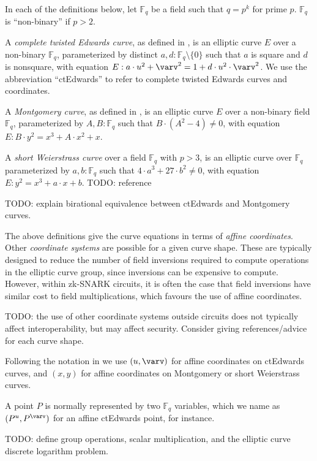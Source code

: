 \documentclass{article}
\newcommand{\typecolon}{:}
\newcommand{\Field}[1]{\mathbb{F}_{\!#1}}
\newcommand{\setof}[1]{\{{#1}\}}
\newcommand{\mult}{\cdot}
\begin{document}
In each of the definitions below, let $\Field{q}$ be a field such that $q = p^k$ for
prime $p$. $\Field{q}$ is ``non-binary'' if $p > 2$.

A \emph{complete twisted Edwards curve}, as defined in \cite[section 4.3.4]{BL2017},
is an elliptic curve $E$ over a non-binary $\Field{q}$, parameterized by distinct
$a, d \typecolon \Field{q} \setminus \setof{0}$ such that $a$ is square and $d$ is nonsquare,
with equation $E : a \mult u^2 + \varv^2 = 1 + d \mult u^2 \mult \varv^2$.
We use the abbreviation ``ctEdwards'' to refer to complete twisted Edwards curves
and coordinates.

A \emph{Montgomery curve}, as defined in \cite[section 4.3]{BL2017},
is an elliptic curve $E$ over a non-binary field $\Field{q}$, parameterized by
$A, B \typecolon \Field{q}$ such that $B \mult (A^2 - 4) \neq 0$, with equation
$E : B \mult y^2 = x^3 + A \mult x^2 + x$.

A \emph{short Weierstrass curve} over a field $\Field{q}$ with $p > 3$, is an
elliptic curve over $\Field{q}$ parameterized by $a, b \typecolon \Field{q}$
such that $4 \mult a^3 + 27 \mult b^2 \neq 0$, with equation
$E : y^2 = x^3 + a \mult x + b$. TODO: reference

TODO: explain birational equivalence between ctEdwards and Montgomery curves.

The above definitions give the curve equations in terms of \emph{affine coordinates}.
Other \emph{coordinate systems} are possible for a given curve shape. These are typically
designed to reduce the number of field inversions required to compute operations in the
elliptic curve group, since inversions can be expensive to compute. However, within
zk-SNARK circuits, it is often the case that field inversions have similar cost to field
multiplications, which favours the use of affine coordinates.

TODO: the use of other coordinate systems outside circuits does not typically affect
interoperability, but may affect security. Consider giving references/advice for each
curve shape.

Following the notation in \cite{BL2017} we use $(u, \varv)$ for affine coordinates on
ctEdwards curves, and $(x, y)$ for affine coordinates on Montgomery or short Weierstrass
curves.

A point $P$ is normally represented by two $\Field{q}$ variables, which
we name as $(P^u, P^{\varv})$ for an affine ctEdwards point, for instance.

TODO: define group operations, scalar multiplication, and the elliptic curve discrete
logarithm problem.
\end{document}
